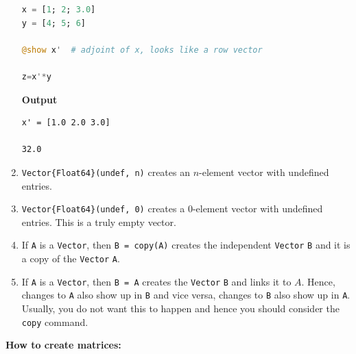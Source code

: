 \begin{enumerate}
\begin{lstlisting}[language=Julia,style=mystyle]
x = [1; 2; 3.0]
y = [4; 5; 6]

@show x'  # adjoint of x, looks like a row vector

z=x'*y
\end{lstlisting}
\textbf{Output} 
\begin{verbatim}
x' = [1.0 2.0 3.0]

32.0
\end{verbatim}

\item \texttt{Vector\{Float64\}(undef, n)} creates an $n$-element vector with undefined entries. 

\item \texttt{Vector\{Float64\}(undef, 0)} creates a $0$-element vector with undefined entries. This is a truly empty vector.

\item If \texttt{A} is a \texttt{Vector}, then \texttt{B = copy(A)} creates the independent \texttt{Vector} \texttt{B} and it is a copy of the \texttt{Vector} \texttt{A}.

\item If \texttt{A} is a \texttt{Vector}, then \texttt{B = A} creates the \texttt{Vector} \texttt{B} and links it to $A$. Hence, changes to \texttt{A} also show up in \texttt{B} and vice versa, changes to \texttt{B} also show up in \texttt{A}. Usually, you do not want this to happen and hence you should consider the \texttt{copy} command. 


\end{enumerate}

\textbf{How to create matrices:}

